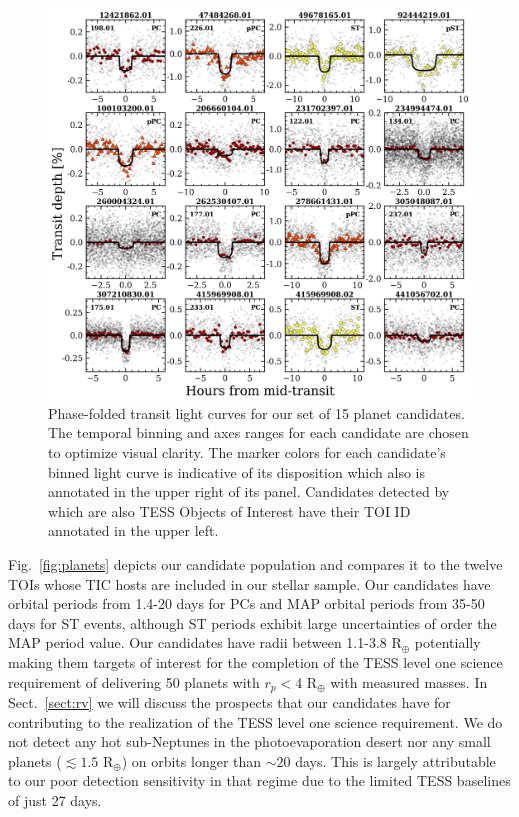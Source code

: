 

\begin{figure}
  \centering
  \includegraphics[width=0.8\hsize]{figures/transitLC_PCs.png}
  \caption[Phase-folded transit light curves of the \texttt{ORION} planet candidate sample.]
          {Phase-folded transit light curves for our set of 15 planet candidates. The temporal binning and axes
    ranges for each candidate are chosen to optimize visual clarity. The marker colors for each candidate's binned
    light curve is indicative of its disposition which also is annotated in the upper
    right of its panel. Candidates detected by \pipeline{} which are also TESS Objects of Interest 
    have their TOI ID annotated in the upper left.}
  \label{fig:LCs}
\end{figure}

Fig.~\ref{fig:planets} depicts our candidate population and compares it to the twelve TOIs whose TIC hosts are
included in our stellar sample. Our candidates have orbital periods from 1.4-20 days for
PCs and MAP orbital periods from 35-50 days for ST events,
although ST periods exhibit large uncertainties of order the MAP
period value. Our candidates have radii between 1.1-3.8 R$_{\oplus}$ potentially making them targets of interest
for the completion of the TESS level one science requirement of delivering 50 planets with $r_p < 4$
R$_{\oplus}$ with measured masses. In Sect.~\ref{sect:rv} we will discuss the prospects that our
candidates have  for contributing to the realization of the TESS level one science requirement.
We do not detect any hot sub-Neptunes in the photoevaporation desert
\citep{lundkvist16} nor any small planets ($\lesssim 1.5$ R$_{\oplus}$) on orbits longer than $\sim 20$
days. This is largely attributable to our poor detection sensitivity in that regime due to the limited
TESS baselines of just 27 days. \\


